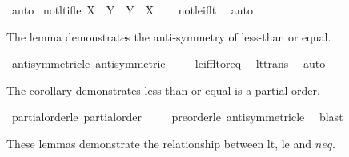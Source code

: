 \begin{isabellebody}
\ auto%
\endisatagproof
{\isafoldproof}%
%
\isadelimproof
\isanewline
%
\endisadelimproof
\isanewline
{}\isamarkupfalse%
\ not{\isacharunderscore}{\kern0pt}lt{\isacharunderscore}{\kern0pt}if{\isacharunderscore}{\kern0pt}le{\isacharcolon}{\kern0pt}\ {\isachardoublequoteopen}X\ {\isasymle}\ Y\ {\isasymLongrightarrow}\ {\isasymnot}{\isacharparenleft}{\kern0pt}Y\ {\isacharless}{\kern0pt}\ X{\isacharparenright}{\kern0pt}{\isachardoublequoteclose}\isanewline
%
\isadelimproof
\ \ %
\endisadelimproof
%
\isatagproof
{}\isamarkupfalse%
\ not{\isacharunderscore}{\kern0pt}le{\isacharunderscore}{\kern0pt}if{\isacharunderscore}{\kern0pt}lt\ \isamarkupfalse%
\ auto%
\endisatagproof
{\isafoldproof}%
%
\isadelimproof
%
\endisadelimproof
%
\begin{isamarkuptext}%
The lemma demonstrates the anti-symmetry of less-than or equal.%
\end{isamarkuptext}\isamarkuptrue%
\isamarkupfalse%
\ antisymmetric{\isacharunderscore}{\kern0pt}le{\isacharcolon}{\kern0pt}\ {\isachardoublequoteopen}antisymmetric\ {\isacharparenleft}{\kern0pt}{\isasymle}{\isacharparenright}{\kern0pt}{\isachardoublequoteclose}\isanewline
%
\isadelimproof
\ \ %
\endisadelimproof
%
\isatagproof
{}\isamarkupfalse%
\ le{\isacharunderscore}{\kern0pt}iff{\isacharunderscore}{\kern0pt}lt{\isacharunderscore}{\kern0pt}or{\isacharunderscore}{\kern0pt}eq\ \isamarkupfalse%
\ lt{\isacharunderscore}{\kern0pt}trans\ \isamarkupfalse%
\ auto%
\endisatagproof
{\isafoldproof}%
%
\isadelimproof
%
\endisadelimproof
%
\begin{isamarkuptext}%
The corollary demonstrates less-than or equal is a partial order.%
\end{isamarkuptext}\isamarkuptrue%
\isamarkupfalse%
\ partial{\isacharunderscore}{\kern0pt}order{\isacharunderscore}{\kern0pt}le{\isacharcolon}{\kern0pt}\ {\isachardoublequoteopen}partial{\isacharunderscore}{\kern0pt}order\ {\isacharparenleft}{\kern0pt}{\isasymle}{\isacharparenright}{\kern0pt}{\isachardoublequoteclose}\isanewline
%
\isadelimproof
\ \ %
\endisadelimproof
%
\isatagproof
{}\isamarkupfalse%
\ preorder{\isacharunderscore}{\kern0pt}le\ antisymmetric{\isacharunderscore}{\kern0pt}le\ \isamarkupfalse%
\ blast%
\endisatagproof
{\isafoldproof}%
%
\isadelimproof
%
\endisadelimproof
%
\begin{isamarkuptext}%
These lemmas demonstrate the relationship between lt, le and $neq$.%

\end{isamarkuptext}
\end{isabellebody}
